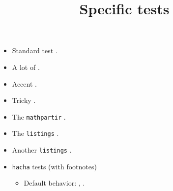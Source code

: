 \documentclass{article}
\title{Specific tests}
\author{}
\date{}
\begin{document}
\maketitle
\begin{itemize}
\item Standard test .
\item A lot of .
\item Accent .
\item Tricky .
\item The \texttt{mathpartir} .
\item The \texttt{listings} .
\item Another \texttt{listings} .
\item \texttt{hacha} tests (with footnotes)
\begin{itemize}
\item Default behavior: ,
.
\end{itemize}
\end{itemize}
\end{document}
